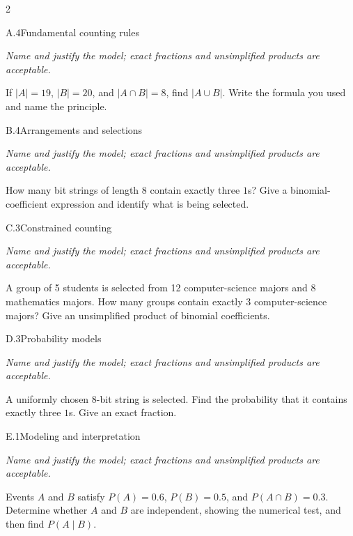\documentclass[9pt]{extarticle}
\begin{document}
\CoreWorkArea
\FormBreak
{}
\begin{multicols}{2}
\begin{CoreProblem}{A.4}{Fundamental counting rules}
{\scriptsize\textit{Name and justify the model; exact fractions and unsimplified products are acceptable.}\par}
If $|A|=19$, $|B|=20$, and $|A\cap B|=8$, find $|A\cup B|$. Write
    the formula you used and name the principle.
\end{CoreProblem}
\begin{CoreProblem}{B.4}{Arrangements and selections}
{\scriptsize\textit{Name and justify the model; exact fractions and unsimplified products are acceptable.}\par}
How many bit strings of length 8 contain exactly three $1$s? Give a
    binomial-coefficient expression and identify what is being selected.
\end{CoreProblem}
\begin{CoreProblem}{C.3}{Constrained counting}
{\scriptsize\textit{Name and justify the model; exact fractions and unsimplified products are acceptable.}\par}
A group of 5 students is selected from 12 computer-science majors and
    8 mathematics majors. How many groups contain exactly 3 computer-science
    majors? Give an unsimplified product of binomial coefficients.
\end{CoreProblem}
\columnbreak
\begin{CoreProblem}{D.3}{Probability models}
{\scriptsize\textit{Name and justify the model; exact fractions and unsimplified products are acceptable.}\par}
A uniformly chosen 8-bit string is selected. Find the probability
    that it contains exactly three $1$s. Give an exact fraction.
\end{CoreProblem}
\begin{CoreProblem}{E.1}{Modeling and interpretation}
{\scriptsize\textit{Name and justify the model; exact fractions and unsimplified products are acceptable.}\par}
Events $A$ and $B$ satisfy $P(A)=0.6$, $P(B)=0.5$, and
    $P(A\cap B)=0.3$. Determine whether $A$ and $B$ are independent, showing
    the numerical test, and then find $P(A\mid B)$.
\end{CoreProblem}
\end{multicols}
\CoreWorkArea
\FormBreak
{}
\end{document}
